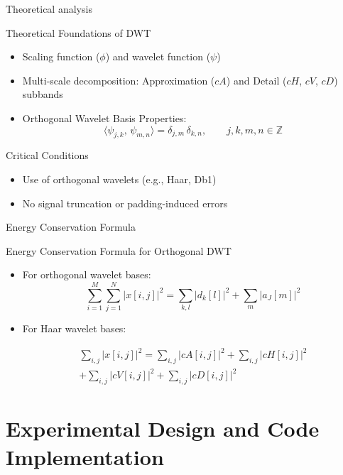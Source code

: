 \documentclass[11pt]{beamer}
\begin{document}
\begin{frame}{Theoretical analysis}
  \begin{block}{Theoretical Foundations of DWT}
    \begin{itemize}
      \item Scaling function ($\phi$) and wavelet function ($\psi$)
      \item Multi-scale decomposition: Approximation ($cA$) and Detail   ($cH$, $cV$, $cD$) subbands
      \item Orthogonal Wavelet Basis Properties:
      \[
\langle \psi_{j,k},\,\psi_{m,n}\rangle
= \delta_{j,m}\,\delta_{k,n},
\qquad j,k,m,n\in\mathbb{Z}
\]


    \end{itemize}
  \end{block}



 

  \begin{block}{Critical Conditions}
    \begin{itemize}
      \item Use of orthogonal wavelets (e.g., Haar, Db1)
      \item No signal truncation or padding-induced errors
    \end{itemize}
  \end{block}
\end{frame}
\begin{frame}{ Energy Conservation Formula }
\begin{block}{Energy Conservation Formula for Orthogonal DWT}
    \begin{itemize}
    \item For orthogonal wavelet bases:
      \[
\sum_{i=1}^{M} \sum_{j=1}^{N} |x[i,j]|^2 = \sum_{k,l} |d_k[l]|^2 + \sum_{m} |a_J[m]|^2
\]  
\item For Haar wavelet bases:

     \[
     \begin{aligned}
\sum_{i,j} |x[i,j]|^2 =\sum_{i,j} |cA[i,j]|^2 + \sum_{i,j} |cH[i,j]|^2 \\+ \sum_{i,j} |cV[i,j]|^2 +\sum_{i,j} |cD[i,j]|^2
\end{aligned}
\]  
    \end{itemize}
  \end{block}



\end{frame}
\section{Experimental Design and Code Implementation}
\end{document}
